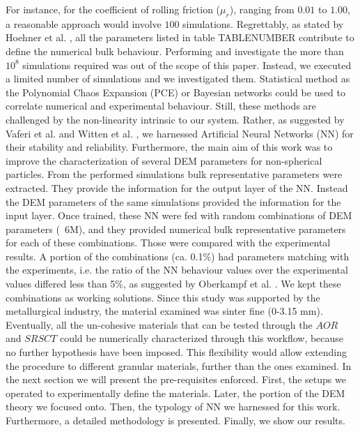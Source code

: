 For instance, for the coefficient of rolling friction ($\mu_r$), ranging from
$0.01$ to $1.00$, a reasonable approach would involve $100$ simulations.
Regrettably, as stated by Hoehner et al. \cite{RefWorks:86}, all the parameters listed in table TABLENUMBER 
contribute to define the numerical bulk behaviour. Performing and investigate the 
more than $10^8$ simulations required was out of the scope of this paper.
Instead, we executed a limited number of simulations and we investigated them. 
Statistical method as the Polynomial Chaos Expansion (PCE) or Bayesian networks 
could be used to correlate numerical and experimental behaviour. 
Still, these methods are challenged by the non-linearity intrinsic to our system. 
Rather, as suggested by Vaferi et al. \cite{RefWorks:150} and Witten et al.
\cite{RefWorks:174}, we harnessed Artificial Neural Networks (NN) for their stability and reliability.
Furthermore, the main aim of this work was to improve the characterization 
of several DEM parameters for non-spherical particles. 
From the performed simulations bulk representative parameters were extracted. 
They provide the information for the output layer of the NN. Instead the DEM 
parameters of the same simulations provided the information for the input layer. 
Once trained, these NN were fed with random combinations of DEM parameters (~6M), 
and they provided numerical bulk representative parameters for each of these combinations. 
Those were compared with the experimental results. A portion of the combinations
(ca. 0.1\%)
had parameters matching with the experiments, i.e. the ratio of the NN behaviour
values over the experimental values differed less than 5\%, as suggested by Oberkampf et al. \cite{RefWorks:160}. 
We kept these combinations as working solutions.
Since this study was supported by the metallurgical industry, the material examined was  sinter fine (0-3.15 mm).
Eventually, all the un-cohesive materials that can be tested through the $AOR$
and $SRSCT$ could be numerically characterized through this workflow, because no
further hypothesis have been imposed.
This flexibility would allow extending the procedure to different granular materials, further than the ones examined.
In the next section we will present the pre-requisites enforced. 
First, the setups we operated to experimentally define the materials. 
Later, the portion of the DEM theory we focused onto. 
Then, the typology of NN we harnessed for this work. 
Furthermore, a detailed methodology is presented. Finally, we show our results.
